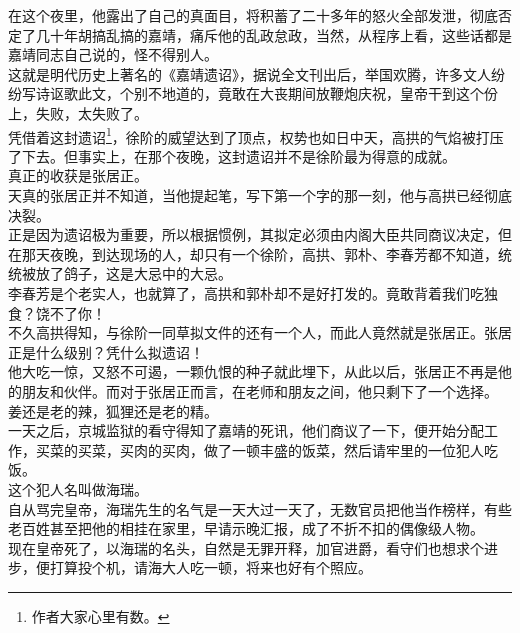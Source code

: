 \begin{multicols}{\theparacolNo}
在这个夜里，他露出了自己的真面目，将积蓄了二十多年的怒火全部发泄，彻底否定了几十年胡搞乱搞的嘉靖，痛斥他的乱政怠政，当然，从程序上看，这些话都是嘉靖同志自己说的，怪不得别人。\\

这就是明代历史上著名的《嘉靖遗诏》，据说全文刊出后，举国欢腾，许多文人纷纷写诗讴歌此文，个别不地道的，竟敢在大丧期间放鞭炮庆祝，皇帝干到这个份上，失败，太失败了。\\

凭借着这封遗诏\footnote{作者大家心里有数。}，徐阶的威望达到了顶点，权势也如日中天，高拱的气焰被打压了下去。但事实上，在那个夜晚，这封遗诏并不是徐阶最为得意的成就。\\

真正的收获是张居正。\\

天真的张居正并不知道，当他提起笔，写下第一个字的那一刻，他与高拱已经彻底决裂。\\

正是因为遗诏极为重要，所以根据惯例，其拟定必须由内阁大臣共同商议决定，但在那天夜晚，到达现场的人，却只有一个徐阶，高拱、郭朴、李春芳都不知道，统统被放了鸽子，这是大忌中的大忌。\\

李春芳是个老实人，也就算了，高拱和郭朴却不是好打发的。竟敢背着我们吃独食？饶不了你！\\

不久高拱得知，与徐阶一同草拟文件的还有一个人，而此人竟然就是张居正。张居正是什么级别？凭什么拟遗诏！\\

他大吃一惊，又怒不可遏，一颗仇恨的种子就此埋下，从此以后，张居正不再是他的朋友和伙伴。而对于张居正而言，在老师和朋友之间，他只剩下了一个选择。\\

姜还是老的辣，狐狸还是老的精。\\

一天之后，京城监狱的看守得知了嘉靖的死讯，他们商议了一下，便开始分配工作，买菜的买菜，买肉的买肉，做了一顿丰盛的饭菜，然后请牢里的一位犯人吃饭。\\

这个犯人名叫做海瑞。\\

自从骂完皇帝，海瑞先生的名气是一天大过一天了，无数官员把他当作榜样，有些老百姓甚至把他的相挂在家里，早请示晚汇报，成了不折不扣的偶像级人物。\\

现在皇帝死了，以海瑞的名头，自然是无罪开释，加官进爵，看守们也想求个进步，便打算投个机，请海大人吃一顿，将来也好有个照应。\\


\end{multicols}
